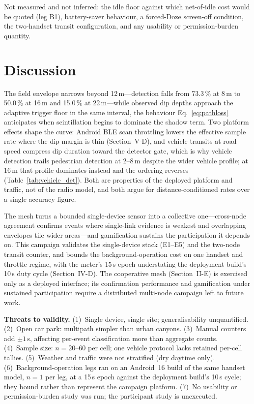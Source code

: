 \documentclass[journal,10pt]{IEEEtran}
\begin{document}
Not measured and not inferred: the idle floor against which net-of-idle
cost would be quoted (leg B1), battery-saver behaviour, a forced-Doze
screen-off condition, the two-handset transit configuration, and any usability
or permission-burden quantity.

\section{Discussion}
The field envelope narrows beyond 12\,m---detection falls from 73.3\,\% at
8\,m to 50.0\,\% at 16\,m and 15.0\,\% at 22\,m---while observed dip depths
approach the adaptive trigger floor in the same interval, the behaviour
Eq.~\eqref{eq:pathloss} anticipates when scintillation begins to dominate the
shadow term. Two platform effects shape the curve: Android BLE scan throttling
lowers the effective sample rate where the dip margin is thin (Section~V-D),
and vehicle transits at road speed compress dip duration toward the detector
gate, which is why vehicle detection trails pedestrian detection at 2--8\,m
despite the wider vehicle profile; at 16\,m that profile dominates instead and
the ordering reverses (Table~\ref{tab:vehicle_det}). Both are properties of the
deployed platform and traffic, not of the radio model, and both argue for
distance-conditioned rates over a single accuracy figure.

The mesh turns a bounded single-device sensor into a collective
one---cross-node agreement confirms events where single-link evidence is
weakest and overlapping envelopes tile wider areas---and gamification
sustains the participation it depends on. This campaign validates the single-device
stack (E1--E5) and the two-node transit counter, and bounds the
background-operation cost on one handset and throttle regime, with the
meter's 15\,s epoch understating the deployment build's 10\,s duty cycle
(Section~IV-D). The cooperative mesh (Section~II-E) is exercised only as a deployed
interface; its confirmation performance and gamification under sustained
participation require a distributed multi-node campaign left to future
work.

\textbf{Threats to validity.} (1)~Single device, single site; generalisability
unquantified. (2)~Open car park: multipath simpler than urban canyons.
(3)~Manual counters add $\pm1$\,s, affecting per-event classification more than
aggregate counts. (4)~Sample size: $n = 20$--$60$ per cell; one vehicle
protocol lacks retained per-cell tallies. (5)~Weather and traffic were not
stratified (dry daytime only). (6)~Background-operation legs ran on an
Android~16 build of the same handset model, $n=1$ per leg, at a 15\,s epoch
against the deployment build's 10\,s cycle; they bound rather than represent
the campaign platform. (7)~No usability or permission-burden study was run; the
participant study is unexecuted.
\end{document}
